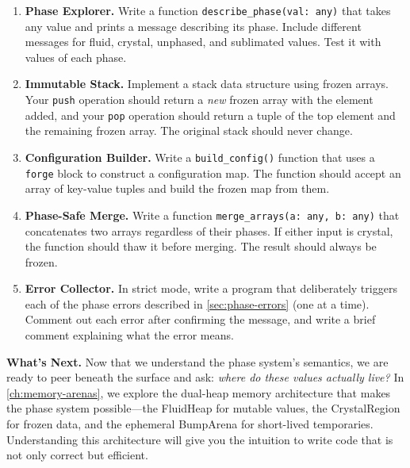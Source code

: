 \begin{enumerate}
  \item \textbf{Phase Explorer.}
    Write a function \lstinline|describe_phase(val: any)| that takes any value and prints a message describing its phase.
    Include different messages for fluid, crystal, unphased, and sublimated values.
    Test it with values of each phase.

  \item \textbf{Immutable Stack.}
    Implement a stack data structure using frozen arrays.
    Your \lstinline|push| operation should return a \emph{new} frozen array with the element added, and your \lstinline|pop| operation should return a tuple of the top element and the remaining frozen array.
    The original stack should never change.

  \item \textbf{Configuration Builder.}
    Write a \lstinline|build_config()| function that uses a \lstinline|forge| block to construct a configuration map.
    The function should accept an array of key-value tuples and build the frozen map from them.

  \item \textbf{Phase-Safe Merge.}
    Write a function \lstinline|merge_arrays(a: any, b: any)| that concatenates two arrays regardless of their phases.
    If either input is crystal, the function should thaw it before merging.
    The result should always be frozen.

  \item \textbf{Error Collector.}
    In strict mode, write a program that deliberately triggers each of the phase errors described in \cref{sec:phase-errors} (one at a time).
    Comment out each error after confirming the message, and write a brief comment explaining what the error means.
\end{enumerate}

\bigskip

\noindent\textbf{What's Next.}\quad
Now that we understand the phase system's semantics, we are ready to peer beneath the surface and ask: \emph{where do these values actually live?}
In \cref{ch:memory-arenas}, we explore the dual-heap memory architecture that makes the phase system possible---the FluidHeap for mutable values, the CrystalRegion for frozen data, and the ephemeral BumpArena for short-lived temporaries.
Understanding this architecture will give you the intuition to write code that is not only correct but efficient.

